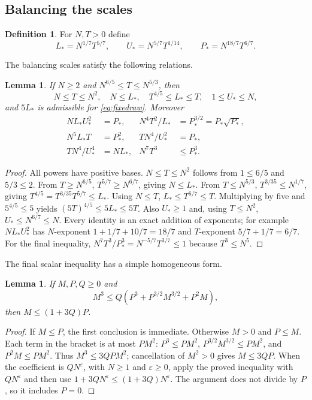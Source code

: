 \documentclass[11pt,a4paper,oneside]{article}
\newtheorem{lemma}[theorem]{Lemma}
\theoremstyle{definition}
\newtheorem{definition}[theorem]{Definition}
\newcommand{\eps}{\varepsilon}
\numberwithin{equation}{section}
\begin{document}
\subsection{Balancing the scales}
\begin{definition}
For $N,T>0$ define
\[
 L_*=N^{1/7}T^{5/7},\qquad U_*=N^{5/7}T^{1/14},\qquad
 P_*=N^{18/7}T^{6/7}.
\]
\end{definition}
The balancing scales satisfy the following relations.
\begin{lemma}\label{lem:scales}
If $N\ge2$ and $N^{6/5}\le T\le N^{5/3}$, then
\[
 N\le T\le N^2,\quad N\le L_*,\quad T^{4/5}\le L_*\le T,
 \quad1\le U_*\le N,
\]
and $5L_*$ is admissible for \eqref{eq:fixedraw}. Moreover
\begin{align*}
 NL_*U_*^2&=P_*,&N^4T^2/L_*&=P_*^{3/2}=P_*\sqrt{P_*},\\
 N^5L_*T&=P_*^2,&TN^4/U_*^2&=P_*,\\
 TN^4/U_*^4&=NL_*,&N^7T^3&\le P_*^3.
\end{align*}
\end{lemma}
\begin{proof}
All powers have positive bases. $N\le T\le N^2$ follows from
$1\le6/5$ and $5/3\le2$. From $T\ge N^{6/5}$,
$T^{5/7}\ge N^{6/7}$, giving $N\le L_*$.
From $T\le N^{5/3}$, $T^{3/35}\le N^{1/7}$, giving
$T^{4/5}=T^{3/35}T^{5/7}\le L_*$. Using $N\le T$,
$L_*\le T^{6/7}\le T$. Multiplying by five and
$5^{4/5}\le5$ yields $(5T)^{4/5}\le5L_*\le5T$.
Also $U_*\ge1$ and, using $T\le N^2$,
$U_*\le N^{6/7}\le N$. Every identity is an exact addition of
exponents; for example $NL_*U_*^2$ has $N$-exponent
$1+1/7+10/7=18/7$ and $T$-exponent $5/7+1/7=6/7$.
For the final inequality,
$N^7T^3/P_*^3=N^{-5/7}T^{3/7}\le1$ because $T^3\le N^5$.
\end{proof}
The final scalar inequality has a simple homogeneous form.
\begin{lemma}\label{lem:absorb}
If $M,P,Q\ge0$ and
\[
 M^3\le Q(P^3+P^{3/2}M^{3/2}+P^2M),
\]
then $M\le(1+3Q)P$.
\end{lemma}
\begin{proof}
If $M\le P$, the first conclusion is immediate. Otherwise $M>0$ and
$P\le M$. Each term in the bracket is at most $PM^2$:
$P^3\le PM^2$, $P^{3/2}M^{3/2}\le PM^2$, and $P^2M\le PM^2$.
Thus $M^3\le3QPM^2$; cancellation of $M^2>0$ gives $M\le3QP$.
When the coefficient is $QN^\eps$, with $N\ge1$ and $\eps\ge0$, apply the proved inequality with $QN^\eps$ and then use
$1+3QN^\eps\le(1+3Q)N^\eps$. The argument does not divide by $P$,
so it includes $P=0$.
\end{proof}
\end{document}
